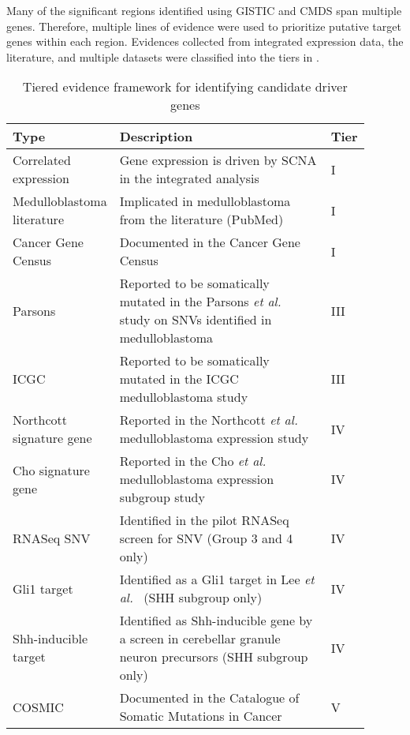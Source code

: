 Many of the significant regions identified using GISTIC and CMDS span multiple genes. Therefore, multiple lines of evidence were used to prioritize putative target genes within each region. Evidences collected from integrated expression data, the literature, and multiple datasets were classified into the tiers in .

\begin{table}[H]
	\caption[Tiered evidence framework for identifying candidate driver genes]
	{
		Tiered evidence framework for identifying candidate driver genes
	}
	\label{tab:driver-evidence}
	\scriptsize
	\setlength{\extrarowheight}{0.5em}
	\centering
	\begin{tabular}{ p{0.25\linewidth} | p{0.6\linewidth} | p{0.05\linewidth} }
		\hline
		\textbf{Type} & \textbf{Description} & \textbf{Tier} \\
		\hline
		Correlated expression & Gene expression is driven by SCNA in the integrated analysis & I \\
		Medulloblastoma literature & Implicated in medulloblastoma from the literature (PubMed) & I \\
		Cancer Gene Census & Documented in the Cancer Gene Census & I \\
		Parsons & Reported to be somatically mutated in the Parsons \emph{et al.}\ \citeref{parsons11} study on SNVs identified in medulloblastoma & III \\
		ICGC & Reported to be somatically mutated in the ICGC medulloblastoma study & III \\
		Northcott signature gene & Reported in the Northcott \emph{et al.}\ \citeref{northcott11a} medulloblastoma expression study & IV \\
		Cho signature gene & Reported in the Cho \emph{et al.}\ \citeref{cho11} medulloblastoma expression subgroup study & IV \\
		RNASeq SNV & Identified in the pilot RNASeq screen for SNV (Group 3 and 4 only) & IV \\
		Gli1 target & Identified as a Gli1 target in Lee \emph{et al.}\ \citeref{lee10} (SHH subgroup only) & IV \\
		Shh-inducible target & Identified as Shh-inducible gene by a screen in cerebellar granule neuron precursors (SHH subgroup only) & IV \\
		COSMIC & Documented in the Catalogue of Somatic Mutations in Cancer & V \\
		\hline
	\end{tabular}
\end{table}

